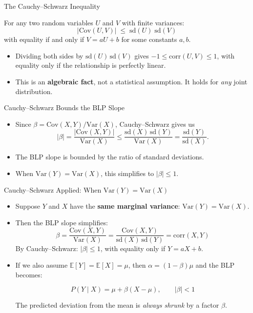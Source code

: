 \documentclass[aspectratio=169, handout]{beamer}
\numberwithin{equation}{section}
\begin{document}
\begin{frame}{The Cauchy--Schwarz Inequality}
\begin{tcolorbox}[colback=blue!5, colframe=blue!50!black, title=Cauchy--Schwarz Inequality]
For any two random variables $U$ and $V$ with finite variances:
$$\bigl|\text{Cov}(U,V)\bigr| \;\leq\; \text{sd}(U)\;\text{sd}(V)$$
with equality if and only if $V = aU + b$ for some constants $a,b$.
\end{tcolorbox}\pause
\begin{itemize}
\item Dividing both sides by $\text{sd}(U)\,\text{sd}(V)$ gives $-1 \leq \text{corr}(U,V) \leq 1$, with equality only if the relationship is perfectly linear.\pause
\item This is an \textbf{algebraic fact}, not a statistical assumption. It holds for \emph{any} joint distribution.
\end{itemize}
\end{frame}

\begin{frame}{Cauchy--Schwarz Bounds the BLP Slope}
\begin{itemize}
\item Since $\beta = \text{Cov}(X,Y)/\text{Var}(X)$, Cauchy--Schwarz gives us
$$|\beta| = \frac{|\text{Cov}(X,Y)|}{\text{Var}(X)} \leq \frac{\text{sd}(X)\,\text{sd}(Y)}{\text{Var}(X)} = \frac{\text{sd}(Y)}{\text{sd}(X)}.$$\pause
\item The BLP slope is bounded by the ratio of standard deviations.\pause
\item When $\text{Var}(Y) = \text{Var}(X)$, this simplifies to $|\beta| \leq 1$.
\end{itemize}
\end{frame}

\begin{frame}{Cauchy--Schwarz Applied: When $\text{Var}(Y)=\text{Var}(X)$}
\begin{itemize}
\item Suppose $Y$ and $X$ have the \textbf{same marginal variance}: $\text{Var}(Y) = \text{Var}(X)$.\pause
\item Then the BLP slope simplifies:
$$\beta = \frac{\text{Cov}(X,Y)}{\text{Var}(X)} = \frac{\text{Cov}(X,Y)}{\text{sd}(X)\,\text{sd}(Y)} = \text{corr}(X,Y)$$
By Cauchy--Schwarz: $|\beta| \leq 1$, with equality only if $Y = aX+b$.\pause
\item If we also assume $\mathbb{E}[Y] = \mathbb{E}[X] = \mu$, then $\alpha = (1-\beta)\mu$ and the BLP becomes:
\begin{tcolorbox}[colback=green!5, colframe=darkgreen, title=Regression to the Mean]
$$P(Y \mid X) = \mu + \beta(X - \mu), \qquad |\beta| < 1$$
\end{tcolorbox}
The predicted deviation from the mean is \emph{always shrunk} by a factor $\beta$.
\end{itemize}
\end{frame}
\end{document}
